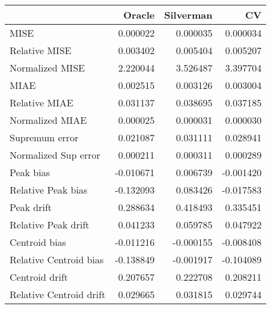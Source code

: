\begin{tabular}{lrrr}
  \toprule
 & Oracle & Silverman & CV \\ 
  \midrule
MISE & 0.000022 & 0.000035 & 0.000034 \\ 
  Relative MISE & 0.003402 & 0.005404 & 0.005207 \\ 
  Normalized MISE & 2.220044 & 3.526487 & 3.397704 \\ 
  MIAE & 0.002515 & 0.003126 & 0.003004 \\ 
  Relative MIAE & 0.031137 & 0.038695 & 0.037185 \\ 
  Normalized MIAE & 0.000025 & 0.000031 & 0.000030 \\ 
  Supremum error & 0.021087 & 0.031111 & 0.028941 \\ 
  Normalized Sup error & 0.000211 & 0.000311 & 0.000289 \\ 
  Peak bias & -0.010671 & 0.006739 & -0.001420 \\ 
  Relative Peak bias & -0.132093 & 0.083426 & -0.017583 \\ 
  Peak drift & 0.288634 & 0.418493 & 0.335451 \\ 
  Relative Peak drift & 0.041233 & 0.059785 & 0.047922 \\ 
  Centroid bias & -0.011216 & -0.000155 & -0.008408 \\ 
  Relative Centroid bias & -0.138849 & -0.001917 & -0.104089 \\ 
  Centroid drift & 0.207657 & 0.222708 & 0.208211 \\ 
  Relative Centroid drift & 0.029665 & 0.031815 & 0.029744 \\ 
   \bottomrule
\end{tabular}
